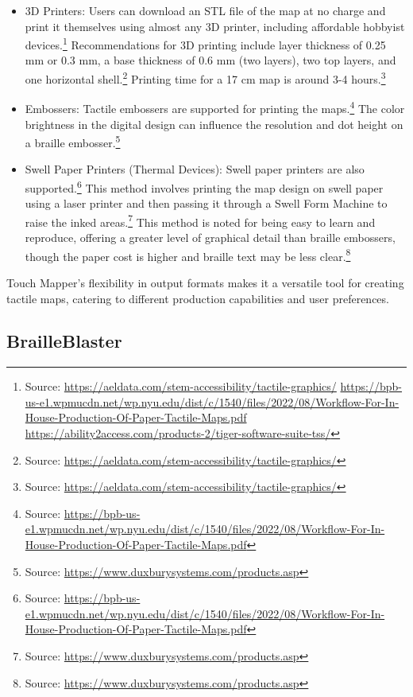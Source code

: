 \begin{itemize}
    \item 3D Printers: Users can download an STL file of the map at no charge and print it themselves using almost any 3D printer, including affordable hobbyist devices.\footnote{Source:  \url{https://aeldata.com/stem-accessibility/tactile-graphics/} \url{https://bpb-us-e1.wpmucdn.net/wp.nyu.edu/dist/c/1540/files/2022/08/Workflow-For-In-House-Production-Of-Paper-Tactile-Maps.pdf} \url{https://ability2access.com/products-2/tiger-software-suite-tss/}} Recommendations for 3D printing include layer thickness of 0.25 mm or 0.3 mm, a base thickness of 0.6 mm (two layers), two top layers, and one horizontal shell.\footnote{Source:  \url{https://aeldata.com/stem-accessibility/tactile-graphics/}} Printing time for a 17 cm map is around 3-4 hours.\footnote{Source:  \url{https://aeldata.com/stem-accessibility/tactile-graphics/}}
    \item Embossers: Tactile embossers are supported for printing the maps.\footnote{Source:  \url{https://bpb-us-e1.wpmucdn.net/wp.nyu.edu/dist/c/1540/files/2022/08/Workflow-For-In-House-Production-Of-Paper-Tactile-Maps.pdf}} The color brightness in the digital design can influence the resolution and dot height on a braille embosser.\footnote{Source:  \url{https://www.duxburysystems.com/products.asp}}
    \item Swell Paper Printers (Thermal Devices): Swell paper printers are also supported.\footnote{Source:  \url{https://bpb-us-e1.wpmucdn.net/wp.nyu.edu/dist/c/1540/files/2022/08/Workflow-For-In-House-Production-Of-Paper-Tactile-Maps.pdf}} This method involves printing the map design on swell paper using a laser printer and then passing it through a Swell Form Machine to raise the inked areas.\footnote{Source:  \url{https://www.duxburysystems.com/products.asp}} This method is noted for being easy to learn and reproduce, offering a greater level of graphical detail than braille embossers, though the paper cost is higher and braille text may be less clear.\footnote{Source:  \url{https://www.duxburysystems.com/products.asp}}
\end{itemize}

Touch Mapper's flexibility in output formats makes it a versatile tool for creating tactile maps, catering to different production capabilities and user preferences.

\subsection{BrailleBlaster}

